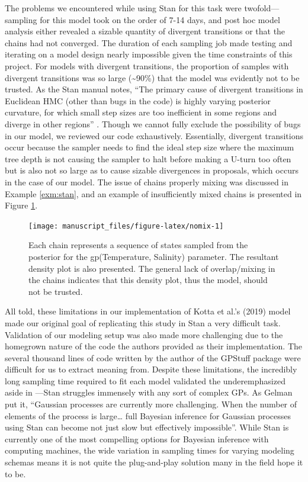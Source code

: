 \documentclass[
  12pt,
  twoside]{book}
\theoremstyle{definition}
\theoremstyle{definition}
\theoremstyle{definition}
\theoremstyle{remark}
\begin{document}
The problems we encountered while using Stan for this task were twofold---sampling for this model took on the order of 7-14 days, and post hoc model analysis either revealed a sizable quantity of divergent transitions or that the chains had not converged.
The duration of each sampling job made testing and iterating on a model design nearly impossible given the time constraints of this project.
For models with divergent transitions, the proportion of samples with divergent transitions was so large (\textasciitilde90\%) that the model was evidently not to be trusted.
As the Stan manual notes, ``The primary cause of divergent transitions in Euclidean HMC (other than bugs in the code) is highly varying posterior curvature, for which small step sizes are too inefficient in some regions and diverge in other regions'' \citep{StanManual2016}.
Though we cannot fully exclude the possibility of bugs in our model, we reviewed our code exhaustively.
Essentially, divergent transitions occur because the sampler needs to find the ideal step size where the maximum tree depth is not causing the sampler to halt before making a U-turn too often but is also not so large as to cause sizable divergences in proposals, which occurs in the case of our model.
The issue of chains properly mixing was discussed in Example \ref{exm:stan}, and an example of insufficiently mixed chains is presented in Figure \ref{fig:nomix}.

\begin{figure}

{\centering \texttt{[image: manuscript\_files/figure-latex/nomix-1]} 

}

\caption{Each chain represents a sequence of states sampled from the posterior for the gp(Temperature, Salinity) parameter. The resultant density plot is also presented. The general lack of overlap/mixing in the chains indicates that this density plot, thus the model, should not be trusted.}\label{fig:nomix}
\end{figure}

All told, these limitations in our implementation of Kotta et al.'s (2019) model made our original goal of replicating this study in Stan a very difficult task.
Validation of our modeling setup was also made more challenging due to the homegrown nature of the code the authors provided as their implementation.
The several thousand lines of code written by the author of the GPStuff package were difficult for us to extract meaning from.
Despite these limitations, the incredibly long sampling time required to fit each model validated the underemphasized aside in \citet{Gelman2015}---Stan struggles immensely with any sort of complex GPs.
As Gelman put it, ``Gaussian processes are currently more challenging. When the number of elements of the process is large\ldots{} full Bayesian inference for Gaussian processes using Stan can become not just slow but effectively impossible''.
While Stan is currently one of the most compelling options for Bayesian inference with computing machines, the wide variation in sampling times for varying modeling schemas means it is not quite the plug-and-play solution many in the field hope it to be.
\end{document}
